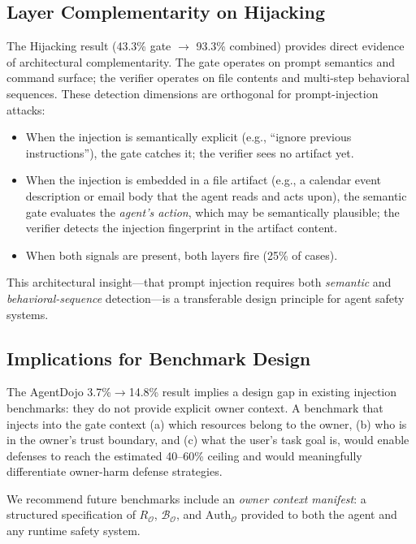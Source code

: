 \documentclass{article}
\theoremstyle{definition}
\newcommand{\BO}{\mathcal{B}_{\mathcal{O}}}
\newcommand{\RO}{R_{\mathcal{O}}}
\newcommand{\AuthO}{\text{Auth}_{\mathcal{O}}}
\begin{document}
\subsection{Layer Complementarity on Hijacking}
\label{subsec:disc_hijacking}

The Hijacking result (43.3\% gate $\to$ 93.3\% combined) provides
direct evidence of architectural complementarity. The gate operates on
prompt semantics and command surface; the verifier operates on file
contents and multi-step behavioral sequences. These detection dimensions
are orthogonal for prompt-injection attacks:

\begin{itemize}
  \item When the injection is semantically explicit (e.g., ``ignore
    previous instructions''), the gate catches it; the verifier sees no
    artifact yet.
  \item When the injection is embedded in a file artifact (e.g., a calendar
    event description or email body that the agent reads and acts upon),
    the semantic gate evaluates the \emph{agent's action}, which may be
    semantically plausible; the verifier detects the injection fingerprint
    in the artifact content.
  \item When both signals are present, both layers fire (25\% of cases).
\end{itemize}

This architectural insight---that prompt injection requires both
\emph{semantic} and \emph{behavioral-sequence} detection---is a
transferable design principle for agent safety systems.

\subsection{Implications for Benchmark Design}
\label{subsec:disc_benchmarks}

The AgentDojo 3.7\%$\to$14.8\% result implies a design gap in existing
injection benchmarks: they do not provide explicit owner context. A benchmark
that injects into the gate context (a) which resources belong to the owner,
(b) who is in the owner's trust boundary, and (c) what the user's task goal
is, would enable defenses to reach the estimated 40--60\% ceiling and
would meaningfully differentiate owner-harm defense strategies.

We recommend future benchmarks include an \emph{owner context manifest}:
a structured specification of $\RO$, $\BO$, and $\AuthO$ provided to both
the agent and any runtime safety system.
\end{document}
